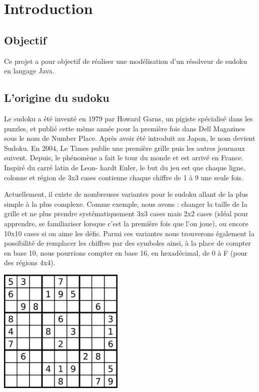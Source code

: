 \section*{Introduction} %

\subsection*{Objectif}
Ce projet a pour objectif de réaliser une modélisation 
d'un résolveur de sudoku en langage Java.

\subsection*{L'origine du sudoku}
Le sudoku a été inventé en 1979 par Howard Garns, un pigiste spécialisé dans les
puzzles, et publié cette même année pour la première fois dans Dell Magazines sous le
nom de Number Place. Après avoir été introduit au Japon, le nom devient Sudoku. En
2004, Le Times publie une première grille puis les autres journaux suivent. Depuis, le
phénomène a fait le tour du monde et est arrivé en France. Inspiré du carré latin de Leon-
hardt Euler, le but du jeu est que chaque ligne, colonne et région de 3x3 cases contienne
chaque chiffre de 1 à 9 une seule fois.

Actuellement, il existe de nombreuses variantes pour le sudoku allant 
de la plus simple à la plus complexe. Comme exemple, nous avons : changer 
la taille de la grille et ne plus prendre systématiquement 3x3 cases mais 2x2 cases 
(idéal pour apprendre, se familiariser lorsque c'est la première fois que l'on joue), 
ou encore 10x10 cases si on aime les défis. Parmi ces variantes nous trouverons également
la possibilité de remplacer les chiffres par des symboles ainsi, à la place de 
compter en base 10, nous pourrions compter en base 16, en hexadécimal, 
de 0 à F (pour des régions 4x4).

\includegraphics [width=60mm]{images/sudokuOriginale.png} \\[0.5cm]